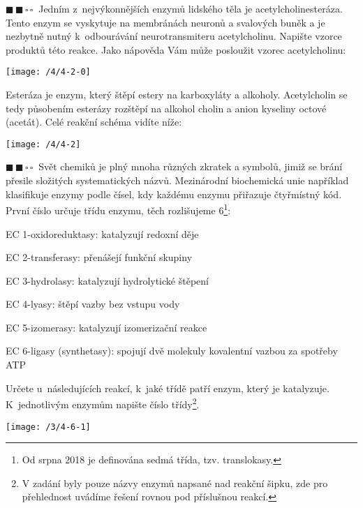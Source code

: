 \documentclass{book}
\newcommand{\dva}{$\blacksquare \, \blacksquare \, \square \, \square \; \; $}
\renewenvironment{quotation}{\par}{\par} %
\begin{document}
\newpage %
\begin{quotation}
\dva Jedním z~nejvýkonnějších enzymů lidského těla je acetylcholinesteráza.
Tento enzym se vyskytuje na membránách neuronů a svalových buněk a
je nezbytně nutný k~odbourávání neurotransmiteru acetylcholinu. Napište vzorce produktů této reakce. Jako nápověda Vám může posloužit vzorec acetylcholinu:
\begin{center}
\texttt{[image: /4/4-2-0]}
\par\end{center}

\end{quotation} \dotfill \par 
Esteráza je enzym, který štěpí estery na karboxyláty a alkoholy. Acetylcholin se tedy působením esterázy rozštěpí na alkohol cholin a anion kyseliny octové (acetát). Celé reakční schéma vidíte níže:
\begin{center}
\texttt{[image: /4/4-2]}
\par\end{center}

\hrulefill %
\begin{quotation}
\dva Svět chemiků je plný mnoha různých zkratek a symbolů, jimiž se brání
přesile složitých systematických názvů. Mezinárodní biochemická unie
například klasifikuje enzymy podle čísel, kdy každému enzymu přiřazuje
čtyřmístný kód. První číslo určuje třídu enzymu, těch rozlišujeme
6\footnote{Od srpna 2018 je definována sedmá třída, tzv. translokasy.}:

EC 1-oxidoreduktasy: katalyzují redoxní děje 

EC 2-transferasy: přenášejí funkční skupiny 

EC 3-hydrolasy: katalyzují hydrolytické štěpení 

EC 4-lyasy: štěpí vazby bez vstupu vody

EC 5-izomerasy: katalyzují izomerizační reakce

EC 6-ligasy (synthetasy): spojují dvě molekuly kovalentní vazbou za
spotřeby ATP 

Určete u~následujících reakcí, k~jaké třídě patří enzym, který je
katalyzuje. K~jednotlivým enzymům napište číslo třídy\footnote{V zadání byly pouze názvy enzymů napsané nad reakční šipku, zde pro přehlednost uvádíme řešení rovnou pod příslušnou reakcí.}.
\end{quotation} \dotfill \par 
\begin{center}
\texttt{[image: /3/4-6-1]}
\end{center}
\end{document}

